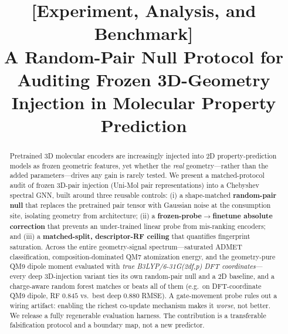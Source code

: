 
\title{[Experiment, Analysis, and Benchmark]\\
A Random-Pair Null Protocol for Auditing Frozen 3D-Geometry
Injection in Molecular Property Prediction}


\begin{abstract}
Pretrained 3D molecular encoders are increasingly injected into 2D
property-prediction models as frozen geometric features, yet whether the
\emph{real} geometry---rather than the added parameters---drives any gain is
rarely tested. We present a matched-protocol audit of frozen 3D-pair injection
(Uni-Mol pair representations) into a Chebyshev spectral GNN, built around three
reusable controls: (i) a shape-matched \textbf{random-pair null} that replaces
the pretrained pair tensor with Gaussian noise at the consumption site, isolating
geometry from architecture; (ii) a \textbf{frozen-probe$\rightarrow$finetune
absolute correction} that prevents an under-trained linear probe from
mis-ranking encoders; and (iii) a \textbf{matched-split, descriptor-RF ceiling}
that quantifies fingerprint saturation. Across the entire geometry-signal
spectrum---saturated ADMET classification, composition-dominated QM7 atomization
energy, and the geometry-pure QM9 dipole moment evaluated with \emph{true
B3LYP/6-31G(2df,p) DFT coordinates}---every deep 3D-injection variant ties its
own random-pair null and a 2D baseline, and a charge-aware random forest matches
or beats all of them (e.g.\ on DFT-coordinate QM9 dipole, RF $0.845$ vs.\ best
deep $0.880$ RMSE). A gate-movement probe rules out a wiring artifact: enabling
the richest co-update mechanism makes it \emph{worse}, not better. We release a
fully regenerable evaluation harness. The contribution is a transferable
falsification protocol and a boundary map, not a new predictor.
\end{abstract}

